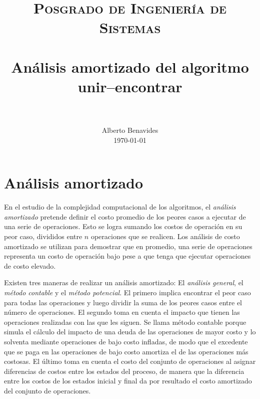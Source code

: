 \documentclass[paper=leter, fontsize=11pt]{scrartcl}
\title{
		\usefont{OT1}{bch}{b}{n}
		\normalfont \normalsize \textsc{Posgrado de Ingeniería de Sistemas} \\ [25pt]
		\horrule{0.5pt} \\[0.4cm]
		\huge Análisis amortizado del algoritmo unir--encontrar \\
		\horrule{2pt} \\[0.5cm]
}
\author{
		\normalfont 								\normalsize
        Alberto Benavides\\[-3pt]		\normalsize
        \today
}
\date{}
\numberwithin{equation}{section}		%
\numberwithin{figure}{section}			%
\numberwithin{table}{section}				%
\begin{document}
\maketitle

\section{Análisis amortizado} \nocite{aa} \nocite{amortized-analysis} \nocite{union-find}
En el estudio de la complejidad computacional de los algoritmos, el \textit{análisis amortizado} pretende definir el costo promedio de los peores casos a ejecutar de una serie de operaciones. Esto se logra sumando los costos de operación en su peor caso, divididos entre $n$ operaciones que se realicen. Los análisis de costo amortizado se utilizan para demostrar que en promedio, una serie de operaciones representa un costo de operación bajo pese a que tenga que ejecutar operaciones de costo elevado.

Existen tres maneras de realizar un análisis amortizado: El \textit{análisis general}, el \textit{método contable} y el \textit{método potencial}. El primero implica encontrar el peor caso para todas las operaciones y luego dividir la suma de los peores casos entre el número de operaciones. El segundo toma en cuenta el impacto que tienen las operaciones realizadas con las que les siguen. Se llama método contable porque simula el cálculo del impacto de una deuda de las operaciones de mayor costo y lo solventa mediante operaciones de bajo costo infladas, de modo que el excedente que se paga en las operaciones de bajo costo amortiza el de las operaciones más costosas. El último toma en cuenta el costo del conjunto de operaciones al asignar diferencias de costos entre los estados del proceso, de manera que la diferencia entre los costos de los estados inicial y final da por resultado el costo amortizado del conjunto de operaciones.
\end{document}
